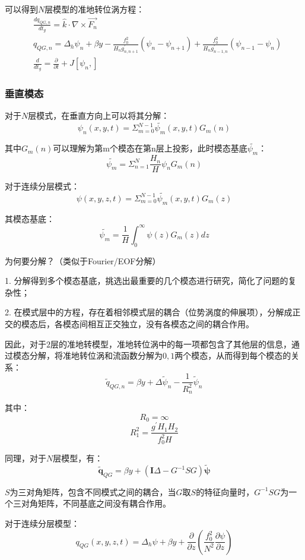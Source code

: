 \documentclass{article}
\begin{document}
可以得到$N$层模型的准地转位涡方程：
\begin{align}
    &\frac{dq_{QG,n}}{dt_g} = \hat{k}\cdot\nabla\times\vec{F_n} \\
    &q_{QG,n} = \Delta_h \psi_n 
    + \beta y 
    - \frac{f_0^2}{H_ng^{\prime}_{n,n+1}}(\psi_n-\psi_{n+1}) 
    + \frac{f_0^2}{H_ng^{\prime}_{n-1,n}}(\psi_{n-1}-\psi_{n}) \\
    &\frac{d}{dt_g} = \frac{\partial }{\partial t} + J[\psi_n, ]
\end{align}

\subsubsection{垂直模态}
对于$N$层模式，在垂直方向上可以将其分解：
$$\psi_n(x,y,t) = \Sigma_{m=0}^{N-1}\tilde{\psi_m}(x,y,t)G_m(n)$$

其中$G_m(n)$可以理解为第m个模态在第n层上投影，此时模态基底$\tilde{\psi_m}$：
$$\tilde{\psi_m}=\Sigma_{n=1}^{N}\frac{H_n}{H}\psi_nG_m(n)$$

对于连续分层模式：
$$\psi(x,y,z,t) = \Sigma_{m=0}^{N-1}\tilde{\psi_m}(x,y,t)G_m(z)$$

其模态基底：
$$\tilde{\psi_m}=\frac{1}{H}\int_{0}^{\infty}\psi(z)G_m(z)dz$$

为何要分解？（类似于Fourier/EOF分解）

1. 分解得到多个模态基底，挑选出最重要的几个模态进行研究，简化了问题的复杂性；

2. 在模式层中的方程，存在着相邻模式层的耦合（位势涡度的伸展项），分解成正交的模态后，各模态间相互正交独立，没有各模态之间的耦合作用。

因此，对于$2$层的准地转模型，准地转位涡中的每一项都包含了其他层的信息，通过模态分解，将准地转位涡和流函数分解为$0,1$两个模态，从而得到每个模态的关系：
$$\tilde{q}_{QG,n} = \beta y + \Delta \tilde{\psi}_n - \frac{1}{R_n^2}\tilde{\psi}_n$$

其中：
$$R_0 = \infty$$
$$R_1^2 = \frac{g^{\prime}H_1H_2}{f_0^2H}$$

同理，对于$N$层模型，有：
$$\tilde{\mathbf{q}}_{QG} = \beta y + (\mathbf{I}\Delta - G^{-1}SG)\tilde{\mathbf{\psi}}$$

$S$为三对角矩阵，包含不同模式之间的耦合，当$G$取$S$的特征向量时，$G^{-1}SG$为一个三对角矩阵，不同基底之间没有耦合作用。

对于连续分层模型：
$$q_{QG}(x,y,z,t) = \Delta_h \psi + \beta y + \frac{\partial}{\partial z}\left(\frac{f_0^2}{N^2}\frac{\partial\psi}{\partial z}\right)$$
\end{document}
